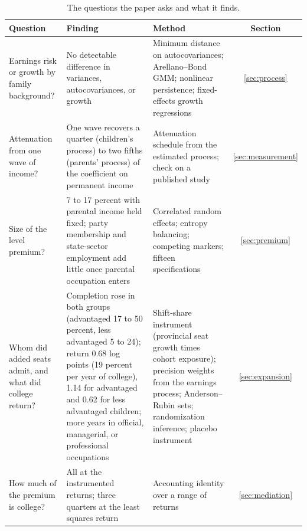 \documentclass[11pt]{article}
\begin{document}
\begin{table}[t]
\centering
\small
\caption{The questions the paper asks and what it finds.}
\label{tab:roadmap}
\begin{tabular}{@{}L{3.2cm}L{5.8cm}L{5.0cm}c@{}}
\toprule
Question & Finding & Method & Section \\
\midrule
Earnings risk or growth by family background? & No detectable
difference in variances, autocovariances, or growth & Minimum distance
on autocovariances; Arellano--Bond GMM; nonlinear persistence;
fixed-effects growth regressions & \ref{sec:process} \\
\addlinespace
Attenuation from one wave of income? & One wave recovers a quarter
(children's process) to two fifths (parents' process) of the
coefficient on permanent income & Attenuation schedule from the
estimated process; check on a published study &
\ref{sec:measurement} \\
\addlinespace
Size of the level premium? & 7 to 17 percent with parental income held
fixed; party membership and state-sector employment add little once
parental occupation enters & Correlated random effects; entropy balancing;
competing markers; fifteen specifications & \ref{sec:premium} \\
\addlinespace
Whom did added seats admit, and what did college return? & Completion
rose in both groups (advantaged 17 to 50 percent, less advantaged 5 to 24); return 0.68 log
points (19 percent per year of college), 1.14 for advantaged and 0.62 for less advantaged children; more years in official, managerial, or professional occupations & Shift-share instrument (provincial seat
growth times cohort exposure); precision weights from the
earnings process; Anderson--Rubin sets; randomization inference; placebo instrument &
\ref{sec:expansion} \\
\addlinespace
How much of the premium is college? & All at the instrumented returns;
three quarters at the least squares return & Accounting identity over
a range of returns & \ref{sec:mediation} \\
\bottomrule
\end{tabular}
\end{table}
\end{document}
